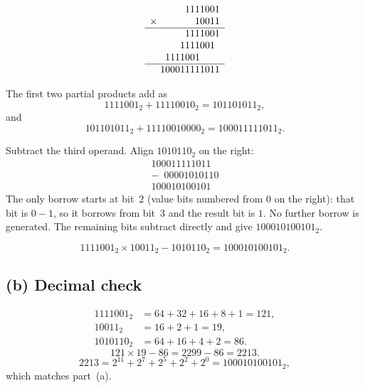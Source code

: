 \documentclass[11pt,a4paper]{article}
\begin{document}
\[
\begin{array}{r@{\;}r}
 & 1111001 \\
\times & 10011 \\
\hline
 & 1111001 \\
 & 1111001\phantom{0} \\
 & 1111001\phantom{0000} \\
\hline
 & 100011111011
\end{array}
\]

The first two partial products add as
\[
1111001_{2}+11110010_{2}=101101011_{2},
\]
and
\[
101101011_{2}+11110010000_{2}=100011111011_{2}.
\]

Subtract the third operand. Align \(1010110_{2}\) on the right:
\[
\begin{array}{r}
  100011111011 \\
-\phantom{1}00001010110 \\
\hline
  100010100101
\end{array}
\]
The only borrow starts at bit~2 (value bits numbered from \(0\) on the right): that bit is \(0-1\), so it borrows from bit~3 and the result bit is \(1\). No further borrow is generated. The remaining bits subtract directly and give \(100010100101_{2}\).

\[
1111001_{2}\times 10011_{2}-1010110_{2}=100010100101_{2}.
\]

\subsection*{(b) Decimal check}

\[
\begin{aligned}
1111001_{2}&=64+32+16+8+1=121, \\
10011_{2}&=16+2+1=19, \\
1010110_{2}&=64+16+4+2=86.
\end{aligned}
\]
\[
121\times 19-86=2299-86=2213.
\]
\[
2213=2^{11}+2^{7}+2^{5}+2^{2}+2^{0}=100010100101_{2},
\]
which matches part~(a).
\end{document}
